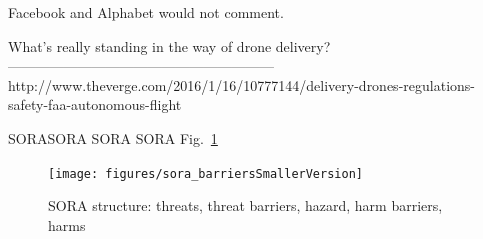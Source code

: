 Facebook and Alphabet would not comment.

What's really standing in the way of drone delivery?
---------------------------------------------------------
http://www.theverge.com/2016/1/16/10777144/delivery-drones-regulations-safety-faa-autonomous-flight


 SORASORA SORA SORA Fig.~\ref{fig:sora_barriersSmallerVersion}
\begin{figure}
\begin{center}
\texttt{[image: figures/sora\_barriersSmallerVersion]}    %
\caption{SORA structure: threats, threat barriers, hazard, harm barriers, harms} 
\label{fig:sora_barriersSmallerVersion}
\end{center}
\end{figure}


